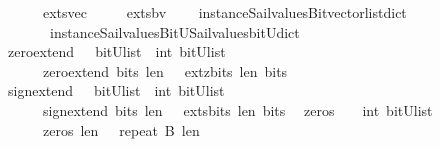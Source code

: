\begin{isabellebody}
\ \ \ \ \ {\isachardoublequoteopen}\ exts{\isacharunderscore}vec\ {\isacharequal}\ {\isacharparenleft}\ \isanewline
\ \ exts{\isacharunderscore}bv\isanewline
\ \ \ \ {\isacharparenleft}instance{\isacharunderscore}Sail{}{\isacharunderscore}values{\isacharunderscore}Bitvector{\isacharunderscore}list{\isacharunderscore}dict\isanewline
\ \ \ \ \ \ \ instance{\isacharunderscore}Sail{}{\isacharunderscore}values{\isacharunderscore}BitU{\isacharunderscore}Sail{}{\isacharunderscore}values{\isacharunderscore}bitU{\isacharunderscore}dict{\isacharparenright}\ {\isacharparenright}{\isachardoublequoteclose}\isanewline
\isanewline
\isanewline
%
\isanewline
{}\isamarkupfalse%
\ zero{\isacharunderscore}extend\ \ {\isacharcolon}{\isacharcolon}\ {\isachardoublequoteopen}{\isacharparenleft}bitU{\isacharparenright}list\ {\isasymRightarrow}\ int\ {\isasymRightarrow}{\isacharparenleft}bitU{\isacharparenright}list\ {\isachardoublequoteclose}\ \ \ \isanewline
\ \ \ \ \ {\isachardoublequoteopen}\ zero{\isacharunderscore}extend\ bits\ len\ {\isacharequal}\ {\isacharparenleft}\ extz{\isacharunderscore}bits\ len\ bits\ {\isacharparenright}{\isachardoublequoteclose}\isanewline
\isanewline
\isanewline
%
\isanewline
{}\isamarkupfalse%
\ sign{\isacharunderscore}extend\ \ {\isacharcolon}{\isacharcolon}\ {\isachardoublequoteopen}{\isacharparenleft}bitU{\isacharparenright}list\ {\isasymRightarrow}\ int\ {\isasymRightarrow}{\isacharparenleft}bitU{\isacharparenright}list\ {\isachardoublequoteclose}\ \ \ \isanewline
\ \ \ \ \ {\isachardoublequoteopen}\ sign{\isacharunderscore}extend\ bits\ len\ {\isacharequal}\ {\isacharparenleft}\ exts{\isacharunderscore}bits\ len\ bits\ {\isacharparenright}{\isachardoublequoteclose}\isanewline
\isanewline
\isanewline
%
\isanewline
{}\isamarkupfalse%
\ zeros\ \ {\isacharcolon}{\isacharcolon}\ {\isachardoublequoteopen}\ int\ {\isasymRightarrow}{\isacharparenleft}bitU{\isacharparenright}list\ {\isachardoublequoteclose}\ \ \ \isanewline
\ \ \ \ \ {\isachardoublequoteopen}\ zeros\ len\ {\isacharequal}\ {\isacharparenleft}\ repeat\ {\isacharbrackleft}B{}{\isacharbrackright}\ len\ {\isacharparenright}{\isachardoublequoteclose}\isanewline

\end{isabellebody}
